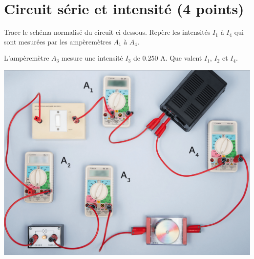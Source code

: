 \section{Circuit série et intensité (4 points)}

\begin{questions}
	\question Trace le schéma normalisé du circuit ci-dessous. Repère les intensités $I_1$ à $I_4$ qui sont mesurées par les ampèremètres $A_1$ à $A_4$.
	
	\question L'ampèremètre $A_3$ mesure une intensité $I_3$ de \num{0.250} A. Que valent $I_1$, $I_2$ et $I_4$.
\end{questions}

\begin{center}
	\includegraphics[scale=0.4]{img/ex15}
\end{center}